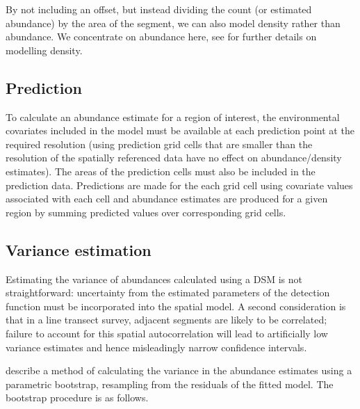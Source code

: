 \documentclass[a4paper,12pt]{article}
\begin{document}
By not including an offset, but instead dividing the count (or estimated abundance) by the area of the segment, we can also model density rather than abundance. We concentrate on abundance here, see \cite{Hedley:2004et} for further details on modelling density.

\subsection*{Prediction}

To calculate an abundance estimate for a region of interest, the environmental covariates included in the model must be available at each prediction point at the required resolution (using prediction grid cells that are smaller than the resolution of the spatially referenced data have no effect on abundance/density estimates). The areas of the prediction cells must also be included in the prediction data. Predictions are made for the each grid cell using covariate values associated with each cell and abundance estimates are produced for a given region by summing predicted values over corresponding grid cells.

\subsection*{Variance estimation}

Estimating the variance of abundances calculated using a DSM is not straightforward: uncertainty from the estimated parameters of the detection function must be incorporated into the spatial model. A second consideration is that in a line transect survey, adjacent segments are likely to be correlated; failure to account for this spatial autocorrelation will lead to artificially low variance estimates and hence misleadingly narrow confidence intervals.

\cite{Hedley:2004et} describe a method of calculating the variance in the abundance estimates using a parametric bootstrap, resampling from the residuals of the fitted model. The bootstrap procedure is as follows.
\end{document}
